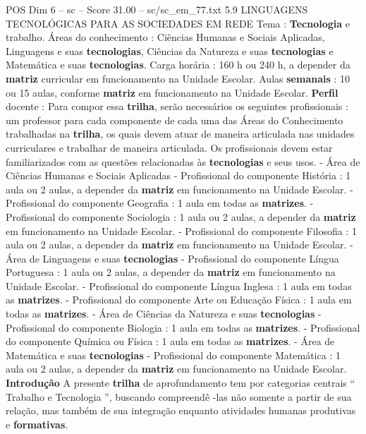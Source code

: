 \begin{textsample}{POS Dim 6 – sc – Score 31.00 – sc/sc\_em\_77.txt}  \label{ex:f6_pos_004}
5.9 LINGUAGENS TECNOLÓGICAS PARA AS SOCIEDADES EM REDE Tema : \textbf{Tecnologia} e trabalho.
Áreas do conhecimento : Ciências Humanas e Sociais Aplicadas, Linguagens e suas \textbf{tecnologias}, Ciências da Natureza e suas \textbf{tecnologias} e Matemática e suas \textbf{tecnologias}.
Carga horária : 160 h ou 240 h, a depender da \textbf{matriz} curricular em funcionamento na Unidade Escolar.
Aulas \textbf{semanais} : 10 ou 15 aulas, conforme \textbf{matriz} em funcionamento na Unidade Escolar. \textbf{Perfil} docente : Para compor essa \textbf{trilha}, serão necessários os seguintes profissionais : um professor para cada componente de cada uma das Áreas do Conhecimento trabalhadas na \textbf{trilha}, os quais devem atuar de maneira articulada nas unidades curriculares e trabalhar de maneira articulada.
Os profissionais devem estar familiarizados com as questões relacionadas às \textbf{tecnologias} e seus usos. - Área de Ciências Humanas e Sociais Aplicadas - Profissional do componente História : 1 aula ou 2 aulas, a depender da \textbf{matriz} em funcionamento na Unidade Escolar. - Profissional do componente Geografia : 1 aula em todas as \textbf{matrizes}. - Profissional do componente Sociologia : 1 aula ou 2 aulas, a depender da \textbf{matriz} em funcionamento na Unidade Escolar. - Profissional do componente Filosofia : 1 aula ou 2 aulas, a depender da \textbf{matriz} em funcionamento na Unidade Escolar. - Área de Linguagens e suas \textbf{tecnologias} - Profissional do componente Língua Portuguesa : 1 aula ou 2 aulas, a depender da \textbf{matriz} em funcionamento na Unidade Escolar. - Profissional do componente Língua Inglesa : 1 aula em todas as \textbf{matrizes}. - Profissional do componente Arte ou Educação Física : 1 aula em todas as \textbf{matrizes}. - Área de Ciências da Natureza e suas \textbf{tecnologias} - Profissional do componente Biologia : 1 aula em todas as \textbf{matrizes}. - Profissional do componente Química ou Física : 1 aula em todas as \textbf{matrizes}. - Área de Matemática e suas \textbf{tecnologias} - Profissional do componente Matemática : 1 aula ou 2 aulas, a depender da \textbf{matriz} em funcionamento na Unidade Escolar. \textbf{Introdução} A presente \textbf{trilha} de aprofundamento tem por categorias centrais “ Trabalho e Tecnologia ”, buscando compreendê -las não somente a partir de sua relação, mas também de sua integração enquanto atividades humanas produtivas e \textbf{formativas}.

\end{textsample}
